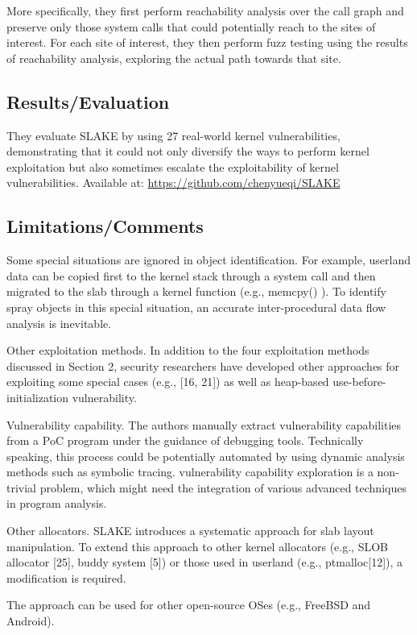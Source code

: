  More specifically, they first perform reachability analysis over the call graph and preserve only those system calls that could potentially reach to the sites of interest. For each site of interest, they then perform fuzz testing using the results of reachability analysis, exploring the actual path towards that site. 
\subsection{Results/Evaluation}
They evaluate SLAKE by using 27 real-world kernel vulnerabilities, demonstrating that it could not only diversify the ways to perform kernel exploitation but also sometimes escalate the exploitability of kernel vulnerabilities.
Available at: \url{https://github.com/chenyueqi/SLAKE}
\subsection{Limitations/Comments}
Some special situations are ignored in object identification. For example, userland data can be copied first to the kernel stack through a system call and then migrated to the slab through a kernel function (e.g., memcpy() ).  To identify spray objects in this special situation, an accurate inter-procedural data flow analysis is inevitable. 

Other exploitation methods. In addition to the four exploitation methods discussed in Section 2, security researchers have developed other approaches for exploiting some special cases (e.g., [16, 21]) as well as heap-based use-before-initialization vulnerability. 

Vulnerability capability. The authors manually extract vulnerability capabilities from a PoC program under the guidance of debugging tools. Technically speaking, this process could be potentially automated by using dynamic analysis methods such as symbolic tracing.  vulnerability capability exploration is a non-trivial problem, which might need the integration of various advanced techniques in program analysis. 

Other allocators. SLAKE introduces a systematic approach for slab layout manipulation. To extend this approach to other kernel allocators (e.g., SLOB allocator [25], buddy system [5]) or those used in userland (e.g., ptmalloc[12]), a modification is required. 

The approach can be used for other open-source OSes (e.g., FreeBSD and Android).
\newpage
